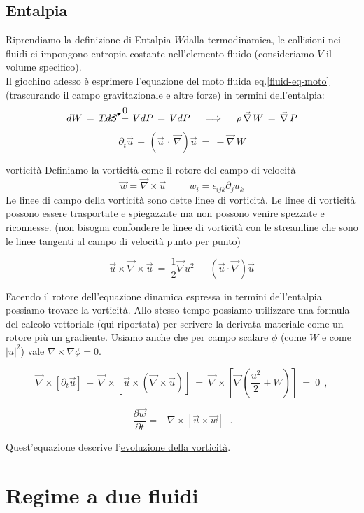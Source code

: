 \subsection{Entalpia} 
Riprendiamo la definizione di Entalpia $W$dalla termodinamica, le collisioni nei fluidi ci impongono entropia costante nell'elemento fluido (consideriamo $V$ il volume specifico). \\Il giochino adesso è esprimere l'equazione del moto fluida eq.\ref{fluid-eq-moto} (trascurando il campo gravitazionale e altre forze) in termini dell'entalpia:
\[dW\,=\,T\cancelto{0}{dS}\,+\,VdP\,=\,VdP\quad \implies\quad \rho\, \vec \nabla\, W\,=\,\vec \nabla\, P\] 
\[\partial _t\vec u\,+\,(\vec u\, \cdot\,\vec \nabla)\vec u\ =\ -\vec \nabla\, W\]

\begin{approfondimento}{vorticità}
	Definiamo la vorticità come il rotore del campo di velocità \[\vec w=\vec \nabla\times\vec u \hspace{1cm}w_i=\epsilon_{ijk}\partial_ju_k\] Le linee di campo della vorticità sono dette linee di vorticità. Le linee di vorticità possono essere trasportate e spiegazzate ma non possono venire spezzate e riconnesse. (non bisogna confondere le linee di vorticità con le streamline che sono le linee tangenti al campo di velocità punto per punto) 
\end{approfondimento}

\[\vec u \times \vec \nabla \times \vec u\ =\ \frac{1}{2} \vec \nabla u^2 \, +\, (\vec u \cdot \vec \nabla)\vec u\]

Facendo il rotore dell'equazione dinamica espressa in termini dell'entalpia possiamo trovare la vorticità. Allo stesso tempo possiamo utilizzare una formula del calcolo vettoriale (qui riportata) per scrivere la derivata materiale come un rotore più un gradiente. Usiamo anche che per campo scalare $\phi $ (come $W$ e come $|u|^2$) vale $\nabla\times\nabla\phi=0$. 

\[\vec \nabla \times [\partial_t \vec u]\, +\, \vec \nabla \times [\vec u\times (\vec \nabla \times \vec u)]\ =\ \vec \nabla \times \left[\vec \nabla \left(\frac{u^2}{2} + W\right)\right]\ =\ 0\ \ ,\]

\[\boxed{\, \frac{\partial \vec w}{\partial t} =-\nabla \times \left[ \vec u\times \vec w \right]\, }\ \ .\]

Quest'equazione descrive l'\underline{evoluzione della vorticità}.


%
%
%
\vspace{0.5cm}
\section{Regime a due fluidi} \label{sezione su due fluidi, lineariz. e onde di plasma}

